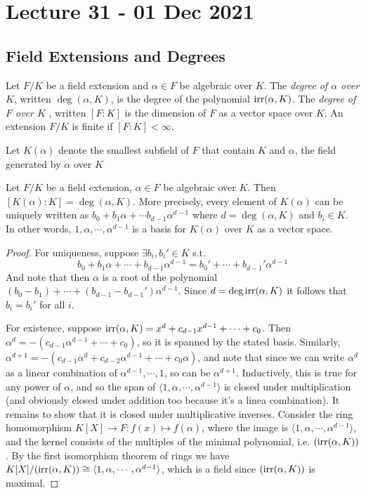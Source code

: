 \section{Lecture 31 - 01 Dec 2021}
\subsection{Field Extensions and Degrees}
\begin{definition}
  Let $F/K$ be a field extension and $\alpha\in F$ be algebraic over $K$. The
  \emph{degree of $\alpha$ over $K$}, written $\deg(\alpha, K)$, is the degree of the
  polynomial $\operatorname{irr}(\alpha, K)$.
  The \emph{degree of $F$ over $K$ }, written $[F:K]$ is the dimension of $F$ as a vector
  space over $K$. An extension $F/K$ is finite if $[F:K]<\infty$.
\end{definition}

\begin{definition}
  Let $K(\alpha)$ denote the smallest subfield of $F$ that contain $K$ and $\alpha$, the
  field generated by $\alpha$ over $K$
\end{definition}

\begin{theorem}
  Let $F/K$ be a field extension, $\alpha\in F$ be algebraic over $K$. Then
  $[K(\alpha):K]=\deg(\alpha, K)$. More precisely, every element of $K(\alpha)$ can be
  uniquely written as $b_0+b_1\alpha +\cdots b_{d-1}\alpha^{d-1}$ where $d=\deg(\alpha,
  K)$ and $b_i\in K$. In other words, $1, \alpha, \cdots, \alpha^{d-1}$ is a basis for
  $K(\alpha)$ over $K$ as a vector space.
\end{theorem}
\begin{proof}
  For uniqueness, suppose $\exists b_i,b_i'\in K$ s.t. 
  \[b_0+b_1\alpha+\cdots+b_{d-1}\alpha^{d-1}=b_0'+\cdots+b_{d-1}'\alpha^{d-1}\]
  And note that then $\alpha$ is a root of the polynomial
  $(b_0-b_1)+\cdots+(b_{d-1}-b_{d-1}')\alpha^{d-1}$. Since $d=\deg\operatorname{irr}(\alpha,K)$ it
  follows that $b_i=b_i'$ for all $i$.

  For existence, suppose $\operatorname{irr}(\alpha, K)=x^d+c_{d-1}x^{d-1}+\cdots+c_0$. Then
  $\alpha^d=-(c_{d-1}\alpha^{d-1}+\cdots +c_0)$, so it is spanned by the stated basis.
  Similarly, $\alpha^{d+1}=-(c_{d-1}\alpha^{d} + c_{d-2}\alpha^{d-1}+\cdots+c_0\alpha)$,
  and note that since we can write $\alpha^d$ as a linear combination of
  $\alpha^{d-1},\cdots, 1$, so can be $\alpha^{d+1}$. Inductively, this is true for any
  power of $\alpha$, and so the span of $\langle 1, \alpha, \cdots, \alpha^{d-1}\rangle$
  is closed under multiplication (and obviously closed under addition too because it's a
  linea combination). It remains to show that it is closed under multiplicative inverses.
  Consider the ring homomorphism $K[X]\to F:f(x)\mapsto f(\alpha)$, where the image is
  $\langle 1,\alpha, \cdots, \alpha^{d-1}\rangle$, and the kernel consists of the
  multiples of the minimal polynomial, i.e. $(\operatorname{irr}(\alpha, K))$. By the first isomorphism
  theorem of rings we have $K[X]/(\operatorname{irr}(\alpha,K))\cong \langle 1,\alpha, \cdots,
  \alpha^{d-1}\rangle$, which is a field since $(\operatorname{irr}(\alpha, K))$ is maximal.
\end{proof}
